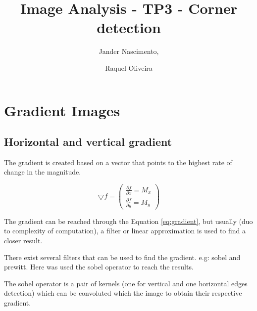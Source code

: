 \documentclass{article}
\begin{document}
\title{Image Analysis - TP3 - Corner detection}

\author{Jander Nascimento, 
\and Raquel Oliveira}

\maketitle

\section{Gradient Images}
	
	\subsection{Horizontal and vertical gradient}

	The gradient is created based on a vector that points to the highest rate of change in the magnitude. 

\begin{equation}
\bigtriangledown f = \begin{pmatrix}
\frac{\partial f}{\partial x} = M_x\\ 
\frac{\partial f}{\partial y} = M_y
\end{pmatrix}
\label{eq:gradient}
\end{equation}

The gradient can be reached through the Equation \ref{eq:gradient}, but usually (duo to complexity of computation), a filter or linear approximation is used to find a closer result.

There exist several filters that can be used to find the gradient. e.g: sobel and prewitt. Here was used the sobel operator to reach the results.

The sobel operator is a pair of kernels (one for vertical and one horizontal edges detection) which can be convoluted which the image to obtain their respective gradient.
\end{document}
